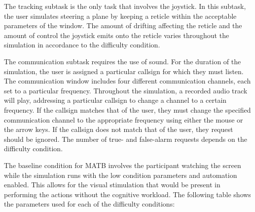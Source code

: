 \documentclass[11pt]{artikel3}
\begin{document}
The tracking subtask is the only task that involves the joystick. In this subtask, the user simulates steering a plane by keeping a reticle within the acceptable parameters of the window. The amount of drifting affecting the reticle and the amount of control the joystick emits onto the reticle varies throughout the simulation in accordance to the difficulty condition.

The communication subtask requires the use of sound. For the duration of the simulation, the user is assigned a particular callsign for which they must listen. The communication window includes four different communication channels, each set to a particular frequency. Throughout the simulation, a recorded audio track will play, addressing a particular callsign to change a channel to a certain frequency. If the callsign matches that of the user, they must change the specified communication channel to the appropriate frequency using either the mouse or the arrow keys. If the callsign does not match that of the user, they request should be ignored. The number of true- and false-alarm requests depends on the difficulty condition. 

The baseline condition for MATB involves the participant watching the screen while the simulation runs with the low condition parameters and automation enabled. This allows for the visual stimulation that would be present in performing the actions without the cognitive workload. The following table shows the parameters used for each of the difficulty conditions:
\end{document}
